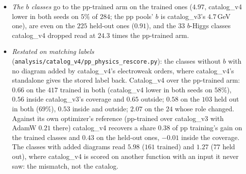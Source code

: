 \documentclass[11pt]{article}
\newcommand{\code}[1]{\texttt{#1}}
\begin{document}
\begin{itemize}
    in catalog\_v4 by its class merges) go to the pp-trained arm: $2.98$, catalog\_v4 lower in both seeds on $8\%$.
  \item \emph{The $b$ classes} go to the pp-trained arm on the trained ones ($4.97$, catalog\_v4 lower in both seeds on
    $5\%$ of $284$; the pp pools' $b$ is catalog\_v3's $4.7$\,GeV one), are even on the $225$ held-out ones ($0.91$), and
    the $33$ $b$-Higgs classes catalog\_v4 dropped read at $24.3$ times the pp-trained arm.
  \item \emph{Restated on matching labels} (\code{analysis/catalog\_v4/pp\_physics\_rescore.py}): the classes without $b$
    with no diagram added by catalog\_v4's electroweak orders, where catalog\_v4's standalone gives the stored label
    back. Catalog\_v4 over the pp-trained arm: $0.66$ on the $417$ trained in both (catalog\_v4 lower in both seeds on
    $58\%$), $0.56$ inside catalog\_v3's coverage and $0.65$ outside; $0.58$ on the $103$ held out in both ($69\%$),
    $0.53$ inside and outside; $2.07$ on the $24$ whose role changed. Against its own optimizer's reference (pp-trained
    over catalog\_v3 with AdamW $0.21$ there) catalog\_v4 recovers a share $0.38$ of pp training's gain on the trained
    classes and $0.43$ on the held-out ones, $-0.01$ inside the coverage. The classes with added diagrams read $5.98$
    ($161$ trained) and $1.27$ ($77$ held out), where catalog\_v4 is scored on another function with an input it never
    saw: the mismatch, not the catalog.
\end{itemize}
\end{document}
